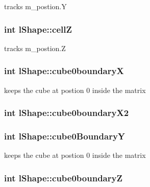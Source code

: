 tracks m\-\_\-postion.\-Y \hypertarget{classl_shape_aa6625e8e7174937db9a4a10332487026}{
\subsubsection[{cell\-Z}]{\setlength{\rightskip}{0pt plus 5cm}int l\-Shape\-::cell\-Z}}\label{classl_shape_aa6625e8e7174937db9a4a10332487026}
tracks m\-\_\-postion.\-Z \hypertarget{classl_shape_a010d0a5f7112c92ba28d1ae461af5bf4}{
\subsubsection[{cube0boundary\-X}]{\setlength{\rightskip}{0pt plus 5cm}int l\-Shape\-::cube0boundary\-X}}\label{classl_shape_a010d0a5f7112c92ba28d1ae461af5bf4}
keeps the cube at postion 0 inside the matrix \hypertarget{classl_shape_a4af09e60d1ee2408c5ff33ada6d6c7ae}{
\subsubsection[{cube0boundary\-X2}]{\setlength{\rightskip}{0pt plus 5cm}int l\-Shape\-::cube0boundary\-X2}}\label{classl_shape_a4af09e60d1ee2408c5ff33ada6d6c7ae}
\hypertarget{classl_shape_a2be443ca8dc155a976e1681b7bb24fc1}{
\subsubsection[{cube0\-Boundary\-Y}]{\setlength{\rightskip}{0pt plus 5cm}int l\-Shape\-::cube0\-Boundary\-Y}}\label{classl_shape_a2be443ca8dc155a976e1681b7bb24fc1}
keeps the cube at postion 0 inside the matrix \hypertarget{classl_shape_abdf2181c2378c1025d0d716062355b31}{
\subsubsection[{cube0boundary\-Z}]{\setlength{\rightskip}{0pt plus 5cm}int l\-Shape\-::cube0boundary\-Z}}\label{classl_shape_abdf2181c2378c1025d0d716062355b31}
